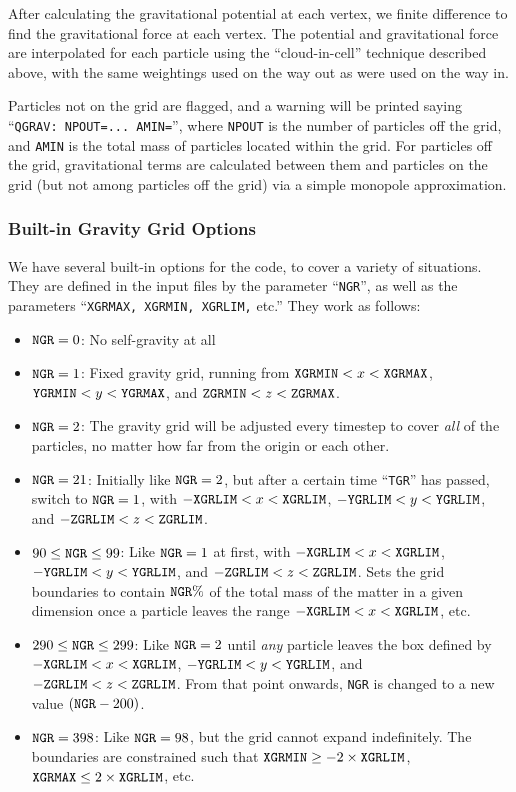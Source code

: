 After calculating the gravitational potential at each vertex, we
finite difference to find the gravitational force at each vertex.
The potential and gravitational force are interpolated for each
particle using the ``cloud-in-cell'' technique described above, with
the same weightings used on the way out as were used on the way in.

Particles not on the grid are flagged, and a warning will be printed
saying ``{\tt QGRAV: NPOUT=...  AMIN=}'', where {\tt NPOUT} is the
number of particles off the grid, and {\tt AMIN} is the total mass of
particles located within the grid.  For particles off the grid,
gravitational terms are calculated between them and particles on the
grid (but not among particles off the grid) via a simple monopole
approximation. 

\subsubsection{Built-in Gravity Grid Options}
\label{nm:gr:bi}
We have several built-in options for the code, to cover a variety of
situations.  They are defined in the input files by the
parameter ``{\tt NGR}'', as well as the parameters ``{\tt XGRMAX,
XGRMIN, XGRLIM,} etc.''  They work as follows:
\begin{itemize}
\item ${\tt NGR}=0$: No self-gravity at all
\item ${\tt NGR}=1$: Fixed gravity grid, running from ${\tt XGRMIN}< x <
{\tt XGRMAX}$, ${\tt YGRMIN}< y < {\tt YGRMAX}$, and ${\tt ZGRMIN}< z
< {\tt ZGRMAX}$. 
\item ${\tt NGR}=2$: The gravity grid will be adjusted every timestep to 
cover {\em all} of the particles, no
matter how far from the origin or each other.
\item ${\tt NGR}=21$: Initially like ${\tt NGR}=2$, but after a certain time
``{\tt TGR}'' has passed, switch to ${\tt NGR}=1$, with ${\tt -XGRLIM}< x <
{\tt XGRLIM}$, ${\tt -YGRLIM}< y < {\tt YGRLIM}$, and ${\tt -ZGRLIM }< z
< {\tt ZGRLIM}$.
\item $90 \le {\tt NGR} \le 99$: Like ${\tt NGR}=1$ 
at first, with ${\tt -XGRLIM}< x <
{\tt XGRLIM}$, ${\tt -YGRLIM}< y < {\tt YGRLIM}$, and ${\tt -ZGRLIM}< z
< {\tt ZGRLIM}$.  Sets the grid boundaries to contain 
${\tt NGR} \%$ of the total mass of the matter in a given dimension once a particle leaves 
the range ${\tt -XGRLIM}< x < {\tt XGRLIM}$, etc.
\item $290 \le {\tt NGR} \le 299$: Like ${\tt NGR}=2$ until {\em any} particle
leaves the box defined by ${\tt -XGRLIM}< x <
{\tt XGRLIM}$, ${\tt -YGRLIM}< y < {\tt YGRLIM}$, and ${\tt -ZGRLIM }< z
< {\tt ZGRLIM}$.  From that point onwards, {\tt NGR} is changed to a new value $({\tt NGR}-200)$.
\item ${\tt NGR}=398$: Like ${\tt NGR}=98$, but the grid cannot expand
indefinitely.  The boundaries are constrained such that ${\tt XGRMIN} \ge
-2\times {\tt XGRLIM}$, ${\tt XGRMAX} \le 2\times {\tt XGRLIM}$, etc.
\end{itemize}


